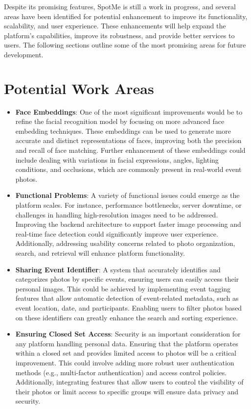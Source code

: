 \documentclass[12pt,a4paper]{report}
\begin{document}
Despite its promising features, SpotMe is still a work in progress, and several areas have been identified for potential enhancement to improve its functionality, scalability, and user experience. These enhancements will help expand the platform’s capabilities, improve its robustness, and provide better services to users. The following sections outline some of the most promising areas for future development.

\section{Potential Work Areas}

\begin{itemize}
    \item \textbf{Face Embeddings}: One of the most significant improvements would be to refine the facial recognition model by focusing on more advanced face embedding techniques. These embeddings can be used to generate more accurate and distinct representations of faces, improving both the precision and recall of face matching. Further enhancement of these embeddings could include dealing with variations in facial expressions, angles, lighting conditions, and occlusions, which are commonly present in real-world event photos.
    

    \item \textbf{Functional Problems}: A variety of functional issues could emerge as the platform scales. For instance, performance bottlenecks, server downtime, or challenges in handling high-resolution images need to be addressed. Improving the backend architecture to support faster image processing and real-time face detection could significantly improve user experience. Additionally, addressing usability concerns related to photo organization, search, and retrieval will enhance platform functionality.

    \item \textbf{Sharing Event Identifier}: A system that accurately identifies and categorizes photos by specific events, ensuring users can easily access their personal images. This could be achieved by implementing event tagging features that allow automatic detection of event-related metadata, such as event location, date, and participants. Enabling users to filter photos based on these identifiers can greatly enhance the search and sorting experience.

    \item \textbf{Ensuring Closed Set Access}: Security is an important consideration for any platform handling personal data. Ensuring that the platform operates within a closed set and provides limited access to photos will be a critical improvement. This could involve adding more robust user authentication methods (e.g., multi-factor authentication) and access control policies. Additionally, integrating features that allow users to control the visibility of their photos or limit access to specific groups will ensure data privacy and security.

   
\end{itemize}
\end{document}
